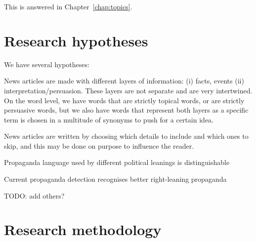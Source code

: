 This is answered in Chapter~\ref{chap:topics}.





\section{\statusred Research hypotheses}
\label{sec:intro_hyp}

We have several hypotheses:

News articles are made with different layers of information: (i) facts, events (ii) interpretation/persuasion.
These layers are not separate and are very intertwined. On the word level, we have words that are strictly topical words, or are strictly persuasive words, but we also have words that represent both layers as a specific term is chosen in a multitude of synonyms to push for a certain idea.

News articles are written by choosing which details to include and which ones to skip, and this may be done on purpose to influence the reader.

Propaganda language used by different political leanings is distinguishable

Current propaganda detection recognises better right-leaning propaganda

TODO: add others?

\section{\statusred Research methodology}
\label{sec:intro_method}

